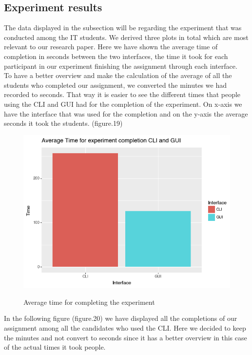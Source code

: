 \documentclass[]{report}
\begin{document}
\subsection{Experiment results}
The data displayed in the subsection will be regarding the experiment that was conducted among the IT students. We derived three plots in total which are most relevant to our research paper. Here we have shown the average time of completion in seconds between the two interfaces, the time it took for each participant in our experiment finishing the assignment through each interface.\\
		
	To have a better overview and make the calculation of the average of all the students who completed our assignment, we converted the minutes we had recorded to seconds. That way it is easier to see the different times that people using the CLI and GUI had for the completion of the experiment. On x-axis we have the interface that was used for the completion and on the y-axis the average seconds it took the students. (figure.19)
\begin{figure}[H]
	\centering
	\includegraphics[width=0.75\linewidth]{ExperimentAverageTime}\\
	\caption{Average time for completing the experiment}
	\label{fig: 19}
\end{figure}


In the following figure (figure.20) we have displayed all the completions of our assignment among all the candidates who used the CLI. Here we decided to keep the minutes and not convert to seconds since it has a better overview in this case of the actual times it took people.
\end{document}

